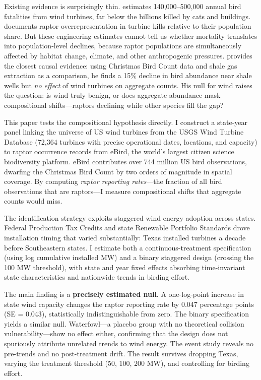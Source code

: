 \documentclass[12pt]{article}
\begin{document}
Existing evidence is surprisingly thin. \citet{loss2013estimates} estimates 140,000--500,000 annual bird fatalities from wind turbines, far below the billions killed by cats and buildings. \citet{smallwood2013comparing} documents raptor overrepresentation in turbine kills relative to their population share. But these engineering estimates cannot tell us whether mortality translates into population-level declines, because raptor populations are simultaneously affected by habitat change, climate, and other anthropogenic pressures. \citet{katovich2024environmental} provides the closest causal evidence: using Christmas Bird Count data and shale gas extraction as a comparison, he finds a 15\% decline in bird abundance near shale wells but \textit{no effect} of wind turbines on aggregate counts. His null for wind raises the question: is wind truly benign, or does aggregate abundance mask compositional shifts---raptors declining while other species fill the gap?

This paper tests the compositional hypothesis directly. I construct a state-year panel linking the universe of US wind turbines from the USGS Wind Turbine Database (72,364 turbines with precise operational dates, locations, and capacity) to raptor occurrence records from eBird, the world's largest citizen science biodiversity platform. eBird contributes over 744 million US bird observations, dwarfing the Christmas Bird Count by two orders of magnitude in spatial coverage. By computing \textit{raptor reporting rates}---the fraction of all bird observations that are raptors---I measure compositional shifts that aggregate counts would miss.

The identification strategy exploits staggered wind energy adoption across states. Federal Production Tax Credits and state Renewable Portfolio Standards drove installation timing that varied substantially: Texas installed turbines a decade before Southeastern states. I estimate both a continuous-treatment specification (using log cumulative installed MW) and a binary staggered design (crossing the 100 MW threshold), with state and year fixed effects absorbing time-invariant state characteristics and nationwide trends in birding effort.

The main finding is a \textbf{precisely estimated null}. A one-log-point increase in state wind capacity changes the raptor reporting rate by 0.047 percentage points (SE = 0.043), statistically indistinguishable from zero. The binary specification yields a similar null. Waterfowl---a placebo group with no theoretical collision vulnerability---show no effect either, confirming that the design does not spuriously attribute unrelated trends to wind energy. The event study reveals no pre-trends and no post-treatment drift. The result survives dropping Texas, varying the treatment threshold (50, 100, 200 MW), and controlling for birding effort.
\end{document}
